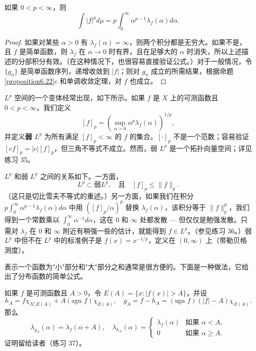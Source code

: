\documentclass[lang=cn,10pt,thmcnt=section]{elegantbook}
\begin{document}
\begin{proposition}\label{proposition6.24}
如果 $0 < p < \infty$，则
\[ \int |f|^p d\mu = p\int_0^{\infty} \alpha^{p-1}\lambda_f(\alpha) d\alpha. \]
\end{proposition}

\begin{proof}
如果对某些 $\alpha > 0$ 有 $\lambda_f(\alpha) = \infty$，则两个积分都是无穷大。如果不是，且 $f$ 是简单函数，则 $\lambda_f$ 在 $\alpha \to 0$ 时有界，且在足够大的 $\alpha$ 时消失，所以上述描述的分部积分有效。（在这种情况下，也很容易直接验证公式。）对于一般情况，令 $\{g_n\}$ 是简单函数序列，递增收敛到 $|f|$；则对 $g_n$ 成立的所需结果，根据命题 \ref{proposition6.22}c 和单调收敛定理，对 $f$ 也成立。
\end{proof}

$L^p$ 空间的一个变体经常出现，如下所示。如果 $f$ 是 $X$ 上的可测函数且 $0 < p < \infty$，我们定义
\[ [f]_p = \left(\sup_{\alpha>0} \alpha^p \lambda_f(\alpha)\right)^{1/p}, \]
并定义\textbf{弱 $L^p$} 为所有满足 $[f]_p < \infty$ 的 $f$ 的集合。$[\cdot]_p$ 不是一个范数；容易验证 $[cf]_p = |c|[f]_p$，但三角不等式不成立。然而，弱 $L^p$ 是一个拓扑向量空间；详见练习 35。

$L^p$ 和弱 $L^p$ 之间的关系如下。一方面，
\[ L^p \subset \text{弱} L^p, \quad \text{且} \quad [f]_p \leq \|f\|_p. \]
（这只是切比雪夫不等式的重述。）另一方面，如果我们在积分 $p\int_0^{\infty} \alpha^{p-1}\lambda_f(\alpha) d\alpha$ 中用 $([f]_p/\alpha)^p$ 替换 $\lambda_f(\alpha)$，该积分等于 $\|f\|_p^p$，我们得到一个常数乘以 $\int_0^{\infty} \alpha^{-1} d\alpha$，这在 $0$ 和 $\infty$ 处都发散 — 但仅仅是勉强发散。只需对 $\lambda_f$ 在 $0$ 和 $\infty$ 附近有稍强一些的估计，就能得到 $f \in L^p$。（参见练习 36。）弱 $L^p$ 中但不在 $L^p$ 中的标准例子是 $f(x) = x^{-1/p}$，定义在 $(0, \infty)$ 上（带勒贝格测度）。

表示一个函数为"小"部分和"大"部分之和通常是很方便的。下面是一种做法，它给出了分布函数的简单公式。

\begin{proposition}\label{proposition6.25}
如果 $f$ 是可测函数且 $A > 0$，令 $E(A) = \{x : |f(x)| > A\}$，并设
\[ h_A = f\chi_{X\setminus E(A)} + A(\text{sgn } f)\chi_{E(A)}, \quad g_A = f - h_A = (\text{sgn } f)(|f| - A)\chi_{E(A)}. \]
那么
\[ \lambda_{g_A}(\alpha) = \lambda_f(\alpha + A), \quad \lambda_{h_A}(\alpha) = \begin{cases} \lambda_f(\alpha) & \text{如果 } \alpha < A, \\ 0 & \text{如果 } \alpha \geq A. \end{cases} \]
证明留给读者（练习 37）。
\end{proposition}
\end{document}
